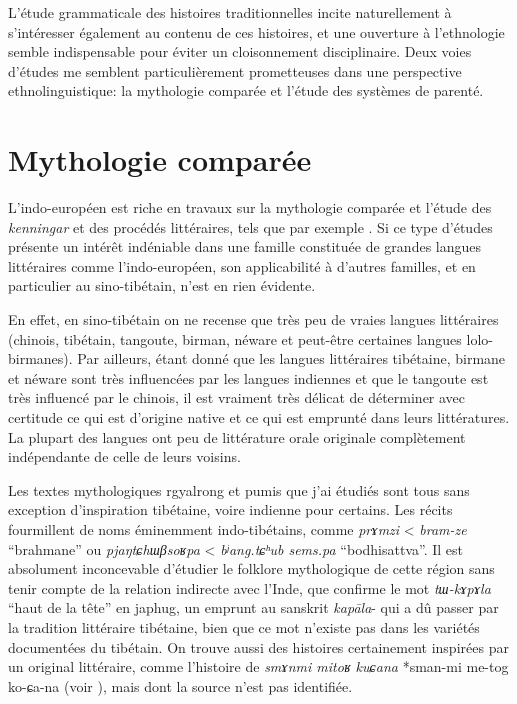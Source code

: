 \documentclass[oldfontcommands,oneside,a4paper,11pt]{memoir}
\begin{document}
L'étude grammaticale des histoires traditionnelles incite naturellement à s'intéresser également au contenu de ces histoires, et une ouverture à l'ethnologie semble indispensable pour éviter un cloisonnement disciplinaire. Deux voies d'études me semblent particulièrement prometteuses dans une perspective ethnolinguistique: la mythologie comparée et l'étude des systèmes de parenté.

\section{Mythologie comparée}
L'indo-européen est riche en travaux sur la mythologie comparée et l'étude des \textit{kenningar} et des procédés littéraires, tels que par exemple \citet{watkins95}. Si ce type d'études présente un intérêt indéniable dans une famille constituée de grandes langues littéraires comme l'indo-européen, son applicabilité à d'autres familles, et en particulier au sino-tibétain, n'est en rien évidente. 

En effet, en sino-tibétain on ne recense que très peu de vraies langues littéraires (chinois, tibétain, tangoute, birman, néware et peut-être certaines langues lolo-birmanes). Par ailleurs, étant donné que les langues littéraires tibétaine, birmane et néware sont très influencées par les langues indiennes et que le tangoute est très influencé par le chinois, il est vraiment très délicat de déterminer avec certitude ce qui est d'origine native et ce qui est emprunté dans leurs littératures. La plupart des langues  ont peu de littérature orale originale complètement indépendante de celle de leurs voisins. 

Les textes mythologiques rgyalrong et pumis que j'ai étudiés sont tous sans exception d'inspiration tibétaine, voire  indienne pour certains. Les récits fourmillent de noms éminemment indo-tibétains, comme \textit{prɤmzi} < \textit{bram-ze} ``brahmane'' ou \textit{pjaŋtɕhɯβsoʁpa} < \textit{bʲang.tɕʰub sems.pa} ``bodhisattva''. Il est absolument inconcevable d'étudier le folklore mythologique de cette région sans tenir compte de la relation indirecte avec l'Inde, que confirme le mot \textit{tɯ-kɤpɤla} ``haut de la tête'' en japhug, un emprunt au sanskrit \textit{kapāla}- qui a dû passer par la tradition littéraire tibétaine, bien que ce mot n'existe pas dans les variétés documentées du tibétain. On trouve aussi des histoires certainement inspirées par un original littéraire, comme l'histoire de \textit{smɤnmi mitoʁ kuɕana} *sman-mi me-tog ko-ɕa-na (voir \citealt{jacques10gesar}), mais dont la source n'est pas identifiée.
\end{document}

